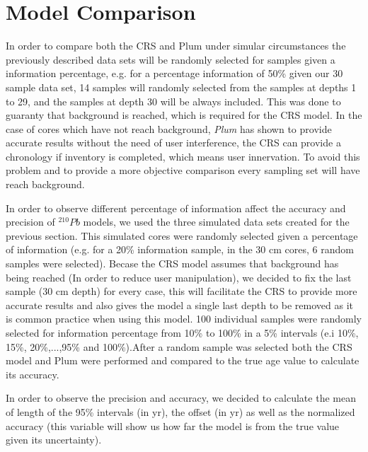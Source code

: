 \documentclass [10pt] {article}
\begin{document}
\section{Model Comparison}

In order to compare both the CRS and Plum under simular circumstances the previously described data sets will be randomly selected for samples given a information percentage, e.g. for a percentage information of 50\% given our 30 sample data set, 14 samples will randomly selected from the samples at depths 1 to 29, and the samples at depth 30 will be always included. This was done to guaranty that background is reached, which is required for the CRS model. In the case of cores which have not reach background, \textit{Plum}  \citep{Aquino2018} has shown to provide accurate results without the need of user interference, the CRS can provide a chronology if inventory is completed, which means user innervation. To avoid this problem and to provide a more objective comparison every sampling set will have reach background.  


In order to observe different percentage of information affect the accuracy and precision of $^{210}Pb$ models, we used the three simulated data sets created for the previous section. This simulated cores were randomly selected given a percentage of information (e.g. for a 20\% information sample, in the 30 cm cores, 6 random samples were selected). Becase the CRS model assumes that background has being reached (In order to reduce user manipulation), we decided to fix the last sample (30 cm depth) for every case, this will facilitate the CRS to provide more accurate results and also gives the model a single last depth to be removed as it is common practice when using this model. 100 individual samples were randomly selected for information percentage from 10\% to 100\% in a 5\% intervals (e.i 10\%, 15\%, 20\%,...,95\% and 100\%).After a random sample was selected both the CRS model and Plum were performed and compared to the true age value to calculate its accuracy. 

In order to observe the precision and accuracy, we decided to calculate the mean of length of the 95\% intervals (in yr), the offset (in yr) as well as the normalized accuracy (this variable will show us how far the model is from the true value given its uncertainty).  
\end{document}
